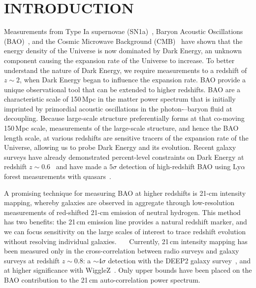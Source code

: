 \documentclass[]{spie}  %
\begin{document}
\section{INTRODUCTION}
\label{sec:intro}  %

Measurements from Type Ia supernovae (SN1a)~\cite{SN1a}, Baryon Acoustic Oscillations (BAO)~\cite{2016MNRAS.457.1770C}, and the Cosmic Microwave Background (CMB)~\cite{2015arXiv150201589P} have shown that the energy density of the Universe is now dominated by Dark Energy, an unknown component causing the expansion rate of the Universe to increase. To better understand the nature of Dark Energy, we require measurements to a redshift of $z\sim2$, when Dark Energy began to influence the expansion rate. BAO provide a unique observational tool that can be extended to higher redshifts. BAO are a characteristic scale of 150\,Mpc in the matter power spectrum that is initially imprinted by primordial acoustic oscillations in the photon-–baryon fluid at decoupling.  Because large-scale structure preferentially forms at that co-moving 150\,Mpc scale, measurements of the large-scale structure, and hence the BAO length scale, at various redshifts are sensitive tracers of the expansion rate of the Universe, allowing us to probe Dark Energy and its evolution.  Recent galaxy surveys have already demonstrated percent-level constraints on Dark Energy at redshift $z\sim0.6$~\cite{2014MNRAS.441...24A} and have made a $5\sigma$ detection of high-redshift BAO using $\mathrm{Ly}\alpha$ forest measurements with quasars~\cite{2015A&A...574A..59D}.\newline

A promising technique for measuring BAO at higher redshifts is 21-cm intensity mapping, whereby galaxies are observed in aggregate through low-resolution measurements of red-shifted 21-cm emission of neutral hydrogen. This method has two benefits: the 21\,cm emission line provides a natural redshift marker, and we can focus sensitivity on the large scales of interest to trace redshift evolution without resolving individual galaxies.~\cite{2015PhRvD..91h3514S}~\cite{2015aska.confE..19S}~\cite{2015ApJ...803...21B} Currently, 21\,cm intensity mapping has been measured only in the cross-correlation between radio surveys and galaxy surveys at redshift $z\sim0.8$: a $\sim$4$\sigma$ detection with the DEEP2 galaxy survey~\cite{2010arXiv1007.3709C}, and at higher significance with WiggleZ~\cite{2013ApJ...763L..20M}. Only upper bounds have been placed on the BAO contribution to the 21\,cm auto-correlation power spectrum.~\cite{2013MNRAS.434L..46S} \newline
\end{document}
